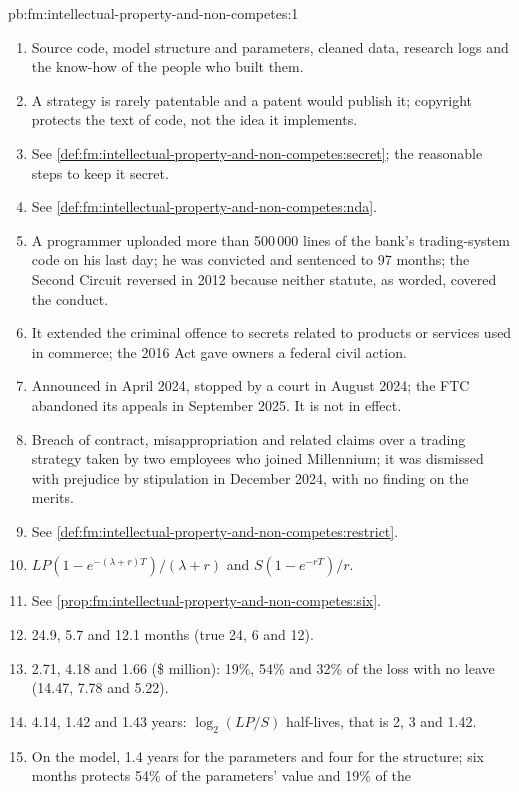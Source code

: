 \begin{solution}{pb:fm:intellectual-property-and-non-competes:1}
\begin{enumerate}
\item Source code, model structure and parameters, cleaned data, research logs and the know-how of the people who built them.
\item A strategy is rarely patentable and a patent would publish it; copyright protects the text of code, not the idea it implements.
\item See \cref{def:fm:intellectual-property-and-non-competes:secret}; the reasonable steps to keep it secret.
\item See \cref{def:fm:intellectual-property-and-non-competes:nda}.
\item A programmer uploaded more than 500\,000 lines of the bank's trading-system code on his last day; he was convicted and sentenced to 97 months;
the Second Circuit reversed in 2012 because neither statute, as worded, covered the conduct.
\item It extended the criminal offence to secrets related to products or services used in commerce; the 2016 Act gave owners a federal civil
action.
\item Announced in April 2024, stopped by a court in August 2024; the FTC abandoned its appeals in September 2025. It is not in effect.
\item Breach of contract,  misappropriation and related claims over a trading strategy taken by two employees who joined Millennium; it
was dismissed with prejudice by stipulation in December 2024, with no finding on the merits.
\item See \cref{def:fm:intellectual-property-and-non-competes:restrict}.
\item $LP(1-e^{-(\lambda+r)T})/(\lambda+r)$ and $S(1-e^{-rT})/r$.
\item See \cref{prop:fm:intellectual-property-and-non-competes:six}.
\item 24.9, 5.7 and 12.1 months (true 24, 6 and 12).
\item 2.71, 4.18 and 1.66 (\$ million): 19\%, 54\% and 32\% of the loss with no leave (14.47, 7.78 and 5.22).
\item 4.14, 1.42 and 1.43 years: $\log_2(LP/S)$ half-lives, that is 2, 3 and 1.42.
\item On the model, 1.4 years for the parameters and four for the structure; six months protects 54\% of the parameters' value and 19\% of the

\end{enumerate}
\end{solution}

